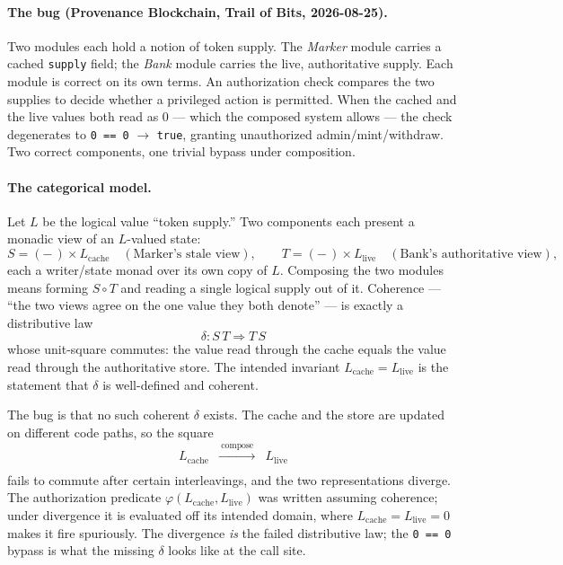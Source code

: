 \documentclass[11pt]{amsart}
\theoremstyle{definition}
\theoremstyle{remark}
\newcommand{\ra}{\rightarrow}
\begin{document}
\paragraph{The bug (Provenance Blockchain, Trail of Bits, 2026-08-25).}
Two modules each hold a notion of token supply. The \emph{Marker} module carries a cached
\texttt{supply} field; the \emph{Bank} module carries the live, authoritative supply. Each module
is correct on its own terms. An authorization check compares the two supplies to decide whether a
privileged action is permitted. When the cached and the live values both read as $0$ --- which the
composed system allows --- the check degenerates to \texttt{0 == 0} $\ra$ \texttt{true},
granting unauthorized admin/mint/withdraw. Two correct components, one trivial bypass under
composition.

\paragraph{The categorical model.}
Let $L$ be the logical value ``token supply.'' Two components each present a monadic view of an
$L$-valued state:
\[
  S = (-\,)\times L_{\mathrm{cache}} \quad(\text{Marker's stale view}),
  \qquad
  T = (-\,)\times L_{\mathrm{live}} \quad(\text{Bank's authoritative view}),
\]
each a writer/state monad over its own copy of $L$. Composing the two modules means forming
$S\circ T$ and reading a single logical supply out of it. Coherence --- ``the two views agree on
the one value they both denote'' --- is exactly a distributive law
\[
  \delta : S\,T \Longrightarrow T\,S
\]
whose unit-square commutes: the value read through the cache equals the value read through the
authoritative store. The intended invariant $L_{\mathrm{cache}} = L_{\mathrm{live}}$ is the
statement that $\delta$ is well-defined and coherent.

The bug is that no such coherent $\delta$ exists. The cache and the store are updated on
different code paths, so the square
\[
\begin{array}{ccc}
  L_{\mathrm{cache}} & \xrightarrow{\ \text{compose}\ } & L_{\mathrm{live}}\\
\end{array}
\]
fails to commute after certain interleavings, and the two representations diverge. The
authorization predicate $\varphi(L_{\mathrm{cache}}, L_{\mathrm{live}})$ was written assuming
coherence; under divergence it is evaluated off its intended domain, where
$L_{\mathrm{cache}} = L_{\mathrm{live}} = 0$ makes it fire spuriously. The divergence
\emph{is} the failed distributive law; the \texttt{0 == 0} bypass is what the missing $\delta$
looks like at the call site.
\end{document}
